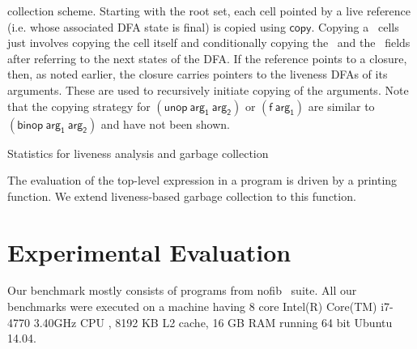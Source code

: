 \documentclass[preprint,9pt]{sigplanconf}
\begin{document}
collection scheme.  Starting with the root set, each cell pointed by a
live reference  (i.e. whose associated  DFA state is final)  is copied
using $\mathsf{copy}$.   Copying a \CONS\ cells  just involves copying
the  cell  itself   and  conditionally  copying  the   \CAR\  and  the
\CDR\ fields after referring to the  next states of the DFA.  If
the reference points to a closure, then, as noted earlier, the closure
carries pointers  to the liveness  DFAs of its  arguments.  These
are  used to recursively  initiate copying of  the arguments.
Note that  the copying  strategy for  $\mathsf{(unop~arg_1~arg_2)}$ or
$\mathsf{(f~arg_1)}$ are similar to $\mathsf{(binop~arg_1~arg_2)}$ and
have not been shown.



\begin{table*}[t!]
\caption{Statistics for liveness analysis and garbage collection}
\label{tab:exp-results}
\centering


\vskip -5mm
\end{table*} 





The evaluation of  the top-level expression in a program  is driven by
a printing function.  
We extend liveness-based  garbage  collection  to
this function.

\section{Experimental Evaluation}
\label{sec:experiments}
  Our benchmark mostly consists  of programs from nofib~\cite{nofib}
suite.  All our
benchmarks were executed on a  machine having 8 core Intel(R) Core(TM)
i7-4770 3.40GHz  CPU ,  8192 KB  L2 cache,  16 GB  RAM running  64 bit
Ubuntu 14.04.


\end{document}
